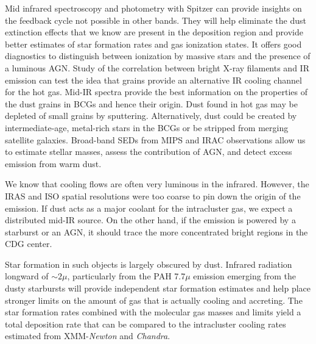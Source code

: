 \documentclass[letterpaper,12pt]{article}
\begin{document}
Mid infrared spectroscopy and photometry with Spitzer can provide insights on the
feedback cycle not possible in other bands.  They will help eliminate the
dust extinction effects that we know are present in the deposition
region and provide better estimates of star formation rates and gas
ionization states.  It offers good diagnostics to distinguish between
ionization by massive stars and the presence of a luminous AGN.  Study
of the correlation between bright X-ray filaments and IR emission can
test the idea that grains provide an alternative IR cooling channel
for the hot gas.  Mid-IR spectra provide the best information on
the properties of the dust grains in BCGs and hence their origin.
Dust found in hot gas may be depleted of small grains by sputtering. 
Alternatively, dust could
be created by intermediate-age, metal-rich stars
in the BCGs or be stripped from merging satellite galaxies. Broad-band
SEDs from MIPS and IRAC observations 
allow us to estimate stellar masses, assess the contribution of AGN, and
detect excess emission from warm dust.



\smallskip

  We know that cooling flows are often very luminous in
the infrared.  However, the IRAS and ISO spatial resolutions were too
coarse to pin down the origin of the emission.  If dust acts as a major
coolant for the intracluster gas, we expect a distributed mid-IR
source.  On the other hand, if the emission is powered by a
starburst or an AGN, it should trace the more concentrated bright
regions in the CDG center.

\smallskip

Star formation in such objects is largely obscured by dust.  
Infrared radiation longward of $\sim 2 \mu$,
particularly from the PAH 7.7$\mu$ emission  emerging from the
dusty starbursts will provide independent star formation estimates and
help place stronger limits on the amount of gas that is actually
cooling and accreting.  The star formation rates combined with the
molecular gas masses and limits yield a total deposition rate that
can be compared to the intracluster cooling rates estimated from
XMM-{\it Newton} and {\it Chandra}.

\smallskip
\end{document}
